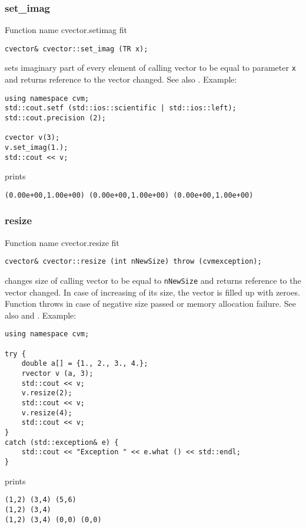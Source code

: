 \subsubsection{set\_imag}
Function%
\pdfdest name {cvector.setimag} fit
\begin{verbatim}
cvector& cvector::set_imag (TR x);
\end{verbatim}
sets imaginary part of every element of  calling vector to be equal to
parameter \verb"x"
and returns  reference to the vector changed.
See also .
Example:
\begin{Verbatim}
using namespace cvm;
std::cout.setf (std::ios::scientific | std::ios::left);
std::cout.precision (2);

cvector v(3);
v.set_imag(1.);
std::cout << v;
\end{Verbatim}
prints
\begin{Verbatim}
(0.00e+00,1.00e+00) (0.00e+00,1.00e+00) (0.00e+00,1.00e+00)
\end{Verbatim}
\newpage


\subsubsection{resize}
Function%
\pdfdest name {cvector.resize} fit
\begin{verbatim}
cvector& cvector::resize (int nNewSize) throw (cvmexception);
\end{verbatim}
changes  size of  calling vector to be equal to
\verb"nNewSize" and returns  reference to
the vector changed.
In case of increasing of its size, the vector
is filled up with zeroes.
Function throws  
in case of negative size passed or memory allocation failure.
See also  and
.
Example:
\begin{Verbatim}
using namespace cvm;

try {
    double a[] = {1., 2., 3., 4.};
    rvector v (a, 3);
    std::cout << v;
    v.resize(2);
    std::cout << v;
    v.resize(4);
    std::cout << v;
}
catch (std::exception& e) {
    std::cout << "Exception " << e.what () << std::endl;
}
\end{Verbatim}
prints
\begin{Verbatim}
(1,2) (3,4) (5,6)
(1,2) (3,4)
(1,2) (3,4) (0,0) (0,0)
\end{Verbatim}
\newpage



